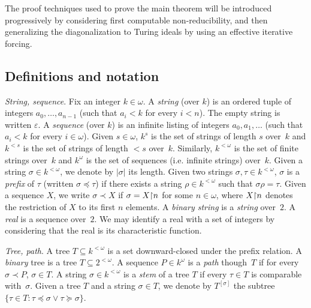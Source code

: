 The proof techniques used to prove the main theorem will be introduced
progressively by considering first computable non-reducibility, and then generalizing
the diagonalization to Turing ideals by using an effective iterative forcing.

\subsection{Definitions and notation}

\emph{String, sequence}.
Fix an integer $k \in \omega$.
A \emph{string} (over $k$) is an ordered tuple of integers $a_0, \dots, a_{n-1}$
(such that $a_i < k$ for every $i < n$). The empty string is written $\varepsilon$. A \emph{sequence}  (over $k$)
is an infinite listing of integers $a_0, a_1, \dots$ (such that $a_i < k$ for every $i \in \omega$).
Given $s \in \omega$,
$k^s$ is the set of strings of length $s$ over~$k$ and
$k^{<s}$ is the set of strings of length $<s$ over~$k$. Similarly,
$k^{<\omega}$ is the set of finite strings over~$k$
and $k^{\omega}$ is the set of sequences (i.e. infinite strings)
over~$k$. 
Given a string $\sigma \in k^{<\omega}$, we denote by $|\sigma|$ its length.
Given two strings $\sigma, \tau \in k^{<\omega}$, $\sigma$ is a \emph{prefix}
of $\tau$ (written $\sigma \preceq \tau$) if there exists a string $\rho \in k^{<\omega}$
such that $\sigma \rho = \tau$. Given a sequence $X$, we write $\sigma \prec X$ if
$\sigma = X {\upharpoonright} n$ for some $n \in \omega$, where $X {\upharpoonright} n$ denotes the restriction of $X$ to its first $n$ elements.
A \emph{binary string} is a \emph{string} over~$2$.
A \emph{real} is a sequence over~$2$.
We may identify a real with a set of integers by considering that the real is its characteristic function.

\emph{Tree, path}.
A tree $T \subseteq k^{<\omega}$ is a set downward-closed under the prefix relation.
A \emph{binary} tree is a tree $T \subseteq 2^{<\omega}$.
A sequence $P \in k^\omega$ is a \emph{path} though~$T$ if for every $\sigma \prec P$,
$\sigma \in T$. A string $\sigma \in k^{<\omega}$ is a \emph{stem} of a tree $T$
if every $\tau \in T$ is comparable with~$\sigma$.
Given a tree $T$ and a string $\sigma \in T$,
we denote by $T^{[\sigma]}$ the subtree $\{\tau \in T : \tau \preceq \sigma \vee \tau \succeq \sigma\}$.

